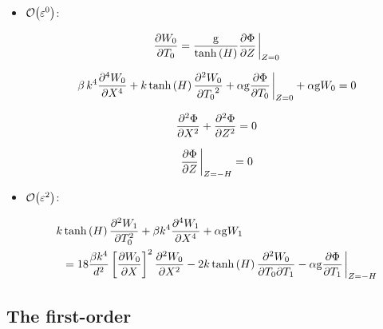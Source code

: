 \begin{itemize}
    \item \ensuremath{\order{\varepsilon^0}}:
    
    \begin{equation}
        \pdv{W_0}{T_0}
        =
        \frac{\mathrm{g}}{\tanh\bkt{H}} \pdv{\Phi}{Z} \eval_{Z=0}
        \label{eq: 1st order kinematic}
    \end{equation}
    
    \begin{equation}
    \begin{aligned}
        \beta\,{k}^{4} {\frac { \partial ^{4} W_0 }{\partial {X}^{4}}} 
        + k\tanh \left( H \right) {\frac {\partial ^{2}  W_0 }{\partial {T_0}^2}}
        + \alpha\mathrm{g}{\frac {\partial \Phi }{\partial T_0}} \eval_{Z=0}
        + \alpha\mathrm{g} W_0
        =0
    \end{aligned}
    \label{eq: 1st order combined}
    \end{equation}
    
    \begin{equation}
        \pdv[2]{\Phi}{X} + \pdv[2]{\Phi}{Z} = 0
        \label{eq: Laplace demensionless}
    \end{equation}
    
    \begin{equation}
        \pdv{\Phi}{Z} \eval_{Z=-H} = 0
        \label{eq: seabed demensionless}
    \end{equation}
    
    \item \ensuremath{\order{\varepsilon^2}}:
    
    \begin{equation}
    \begin{aligned}
        k & \tanh\bkt{H} \pdv[2]{W_1}{T_0}
        + \beta k^4 \pdv[4]{W_1}{X}
        + \alpha \mathrm{g} W_1  
        \\
        & =
        18 \frac{\beta k^4}{d^2} \Bkt{\pdv{W_0}{X}}^2 \pdv[2]{W_0}{X}
        - 2 k \tanh \bkt{H} \pdv{W_0}{T_0}{T_1}
        - \alpha \mathrm{g} \pdv{\Phi}{T_1} \eval_{Z=-H}
    \end{aligned}
    \label{eq: 2nd order combined}
    \end{equation}
\end{itemize}


\subsection{The first-order}

